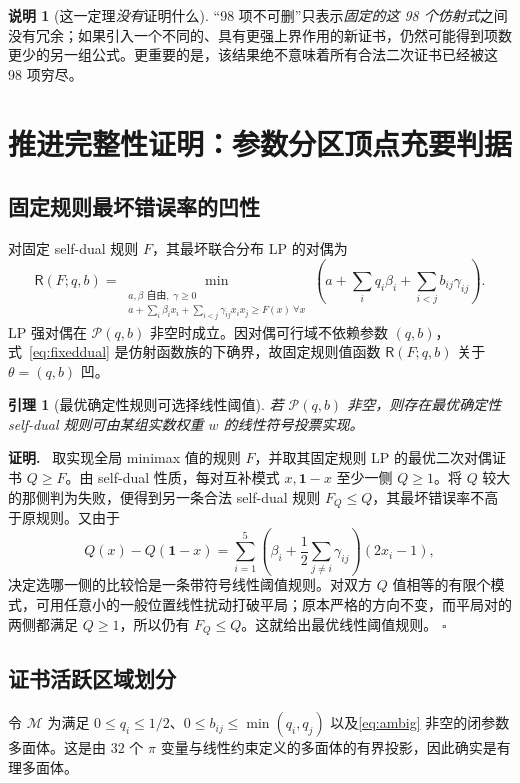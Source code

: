 \documentclass[11pt,a4paper]{ctexart}
\newtheorem{lemma}[theorem]{引理}
\theoremstyle{definition}
\newtheorem{remark}[theorem]{说明}
\newenvironment{proofcn}{\par\noindent\textbf{证明.}\ }{\hfill$\square$\par}
\newcommand{\Risk}{\mathsf R}
\newcommand{\calP}{\mathcal P}
\begin{document}
\begin{remark}[这一定理\emph{没有}证明什么]
“98 项不可删”只表示\emph{固定的这 98 个仿射式}之间没有冗余；如果引入一个不同的、具有更强上界作用的新证书，仍然可能得到项数更少的另一组公式。更重要的是，该结果绝不意味着所有合法二次证书已经被这 98 项穷尽。
\end{remark}

\section{推进完整性证明：参数分区顶点充要判据}
\subsection{固定规则最坏错误率的凹性}
对固定 self-dual 规则 $F$，其最坏联合分布 LP 的对偶为
\begin{equation}\label{eq:fixeddual}
\Risk(F;q,b)=\min_{\substack{a,\beta\text{ 自由},\;\gamma\ge0\\a+\sum_i\beta_ix_i+\sum_{i<j}\gamma_{ij}x_ix_j\ge F(x)\ \forall x}}
\left(a+\sum_iq_i\beta_i+\sum_{i<j}b_{ij}\gamma_{ij}\right).
\end{equation}
LP 强对偶在 $\calP(q,b)$ 非空时成立。因对偶可行域不依赖参数 $(q,b)$，式~\eqref{eq:fixeddual} 是仿射函数族的下确界，故固定规则值函数 $\Risk(F;q,b)$ 关于 $\theta=(q,b)$ 凹。

\begin{lemma}[最优确定性规则可选择线性阈值]
若 $\calP(q,b)$ 非空，则存在最优确定性 self-dual 规则可由某组实数权重 $w$ 的线性符号投票实现。
\end{lemma}
\begin{proofcn}
取实现全局 minimax 值的规则 $F$，并取其固定规则 LP 的最优二次对偶证书 $Q\ge F$。由 self-dual 性质，每对互补模式 $x,\mathbf1-x$ 至少一侧 $Q\ge1$。将 $Q$ 较大的那侧判为失败，便得到另一条合法 self-dual 规则 $F_Q\le Q$，其最坏错误率不高于原规则。又由于
\[
Q(x)-Q(\mathbf1-x)
=\sum_{i=1}^5\left(\beta_i+\frac12\sum_{j\ne i}\gamma_{ij}\right)(2x_i-1),
\]
决定选哪一侧的比较恰是一条带符号线性阈值规则。对双方 $Q$ 值相等的有限个模式，可用任意小的一般位置线性扰动打破平局；原本严格的方向不变，而平局对的两侧都满足 $Q\ge1$，所以仍有 $F_Q\le Q$。这就给出最优线性阈值规则。
\end{proofcn}

\subsection{证书活跃区域划分}
令 $\mathcal M$ 为满足 $0\le q_i\le1/2$、$0\le b_{ij}\le\min(q_i,q_j)$ 以及\eqref{eq:ambig} 非空的闭参数多面体。这是由 $32$ 个 $\pi$ 变量与线性约束定义的多面体的有界投影，因此确实是有理多面体。
\end{document}
